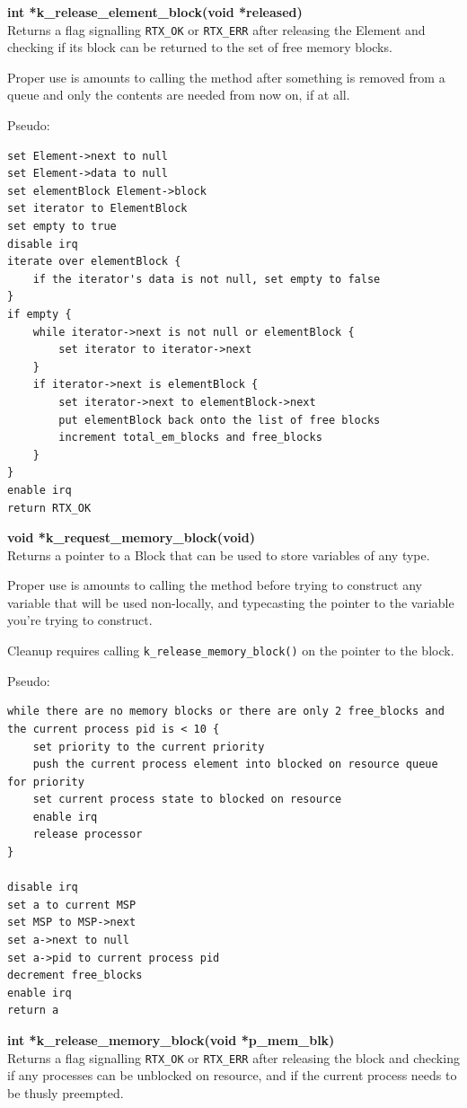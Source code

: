 \documentclass[11pt, oneside]{article}
\begin{document}
{\bf int *k\_release\_element\_block(void *released)}\\
Returns a flag signalling {\tt RTX\_OK} or {\tt RTX\_ERR} after releasing the Element and checking if its block can be returned to the set of free memory blocks.

Proper use is amounts to calling the method after something is removed from a queue and only the contents are needed from now on, if at all.

Pseudo:
\begin{verbatim}
set Element->next to null
set Element->data to null
set elementBlock Element->block
set iterator to ElementBlock
set empty to true
disable irq
iterate over elementBlock {
    if the iterator's data is not null, set empty to false
}
if empty {
    while iterator->next is not null or elementBlock {
        set iterator to iterator->next
    }
    if iterator->next is elementBlock {
        set iterator->next to elementBlock->next
        put elementBlock back onto the list of free blocks
        increment total_em_blocks and free_blocks
    }
}
enable irq
return RTX_OK
\end{verbatim}


{\bf void *k\_request\_memory\_block(void)}\\
Returns a pointer to a Block that can be used to store variables of any type.

Proper use is amounts to calling the method before trying to construct any variable that will be used non-locally, and typecasting the pointer to the variable you're trying to construct.

Cleanup requires calling {\tt k\_release\_memory\_block()} on the pointer to the block.

Pseudo:
\begin{verbatim}
while there are no memory blocks or there are only 2 free_blocks and the current process pid is < 10 {
    set priority to the current priority
    push the current process element into blocked on resource queue for priority
    set current process state to blocked on resource
    enable irq
    release processor
}

disable irq
set a to current MSP
set MSP to MSP->next
set a->next to null
set a->pid to current process pid
decrement free_blocks
enable irq
return a
\end{verbatim}

{\bf int *k\_release\_memory\_block(void *p\_mem\_blk)}\\
Returns a flag signalling {\tt RTX\_OK} or {\tt RTX\_ERR} after releasing the block and checking if any processes can be unblocked on resource, and if the current process needs to be thusly preempted.
\end{document}
